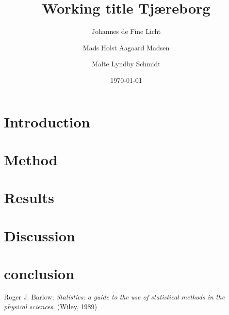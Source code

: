 \documentclass[a4paper,%
               reprint,%
               aps,%
               prl,%
               amsfonts,%
               amssymb,%
               amsmath,%
               twoside,%
               balancelastpage,%
               eqsecnum]%
               {revtex4-1}
\begin{document}

\title{Working title Tjæreborg}
\date{\today}                                                 %
\author{Johannes de Fine Licht}                                    %
\author{Mads Holst Aagaard Madsen}  
\author{Malte Lyndby Schmidt}       

\begin{abstract}                                              

\end{abstract}

\maketitle                                                    %

\section{Introduction}
\label{sec:introduction}


\section{Method}
\label{sec:method}


\section{Results}
\label{sec:results}


\section{Discussion}
\label{sec:discussion}


\section{conclusion}
\label{sec:conclusion}



\begin{thebibliography}{99}                                   

   Roger J. Barlow; \emph{Statistics: a guide to the use of
     statistical methods in the physical sciences}, (Wiley, 1989) 


\end{thebibliography}
\end{document}
